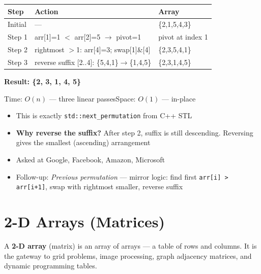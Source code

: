 \documentclass[12pt,a4paper,oneside]{book}
\begin{document}
\begin{dryrun}
\begin{center}
\begin{tabular}{lp{5cm}l}
\toprule
\textbf{Step} & \textbf{Action} & \textbf{Array}\\
\midrule
Initial       & ---                                          & \{2,1,5,4,3\}\\
Step 1        & arr[1]=1 $<$ arr[2]=5 $\to$ pivot=1        & pivot at index 1\\
Step 2        & rightmost $>$1: arr[4]=3; swap[1]\&[4]      & \{2,3,5,4,1\}\\
Step 3        & reverse suffix [2..4]: \{5,4,1\}$\to$\{1,4,5\} & \{2,3,1,4,5\}\\
\bottomrule
\end{tabular}
\end{center}
\textbf{Result: \{2, 3, 1, 4, 5\}}
\end{dryrun}

\begin{complexity}
Time: $O(n)$ --- three linear passes\quad Space: $O(1)$ --- in-place
\end{complexity}

\begin{interviewcorner}
\begin{itemize}
  \item This is exactly \texttt{std::next\_permutation} from C++ STL
  \item \textbf{Why reverse the suffix?} After step 2, suffix is still descending. Reversing gives the smallest (ascending) arrangement
  \item Asked at Google, Facebook, Amazon, Microsoft
  \item Follow-up: \textit{Previous permutation} --- mirror logic: find first \texttt{arr[i] > arr[i+1]}, swap with rightmost smaller, reverse suffix
\end{itemize}
\end{interviewcorner}

\chapter{2-D Arrays (Matrices)}

A \textbf{2-D array} (matrix) is an array of arrays --- a table of rows and columns. It is the gateway to grid problems, image processing, graph adjacency matrices, and dynamic programming tables.
\end{document}
